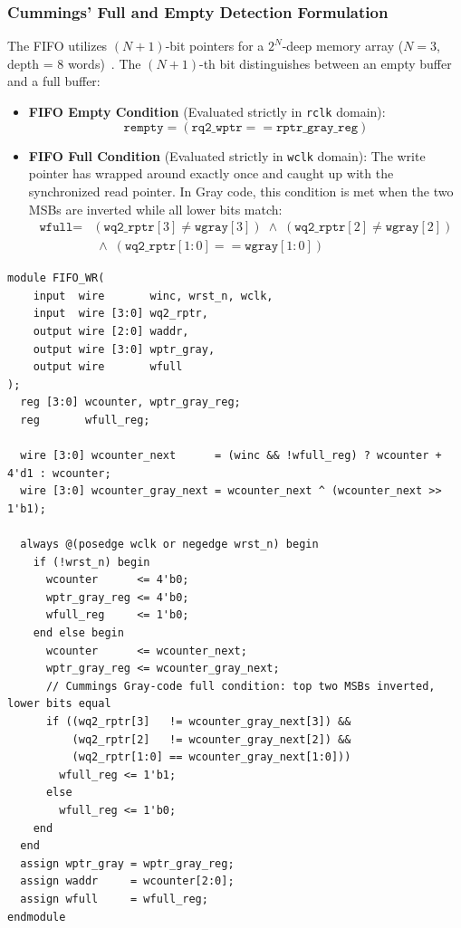 \documentclass[11pt,a4paper]{article}
\begin{document}
\subsubsection{Cummings' Full and Empty Detection Formulation}
The FIFO utilizes $(N+1)$-bit pointers for a $2^N$-deep memory array ($N=3$, depth = 8 words)~\cite{cummings_fifo}. The $(N+1)$-th bit distinguishes between an empty buffer and a full buffer:
\begin{itemize}
    \item \textbf{FIFO Empty Condition} (Evaluated strictly in \texttt{rclk} domain):
    \begin{equation}
    \texttt{rempty} = (\texttt{rq2\_wptr} == \texttt{rptr\_gray\_reg})
    \end{equation}
    \item \textbf{FIFO Full Condition} (Evaluated strictly in \texttt{wclk} domain): The write pointer has wrapped around exactly once and caught up with the synchronized read pointer. In Gray code, this condition is met when the two MSBs are inverted while all lower bits match:
    \begin{equation}
    \begin{split}
    \texttt{wfull} = & (\texttt{wq2\_rptr}[3] \neq \texttt{wgray}[3]) \;\land\; (\texttt{wq2\_rptr}[2] \neq \texttt{wgray}[2]) \\
                     & \;\land\; (\texttt{wq2\_rptr}[1:0] == \texttt{wgray}[1:0])
    \end{split}
    \end{equation}
\end{itemize}

\begin{lstlisting}[caption={Write Pointer and Full Flag Generation (FIFO\_WR.v).}]
module FIFO_WR(
    input  wire       winc, wrst_n, wclk,
    input  wire [3:0] wq2_rptr,
    output wire [2:0] waddr,
    output wire [3:0] wptr_gray,
    output wire       wfull
);
  reg [3:0] wcounter, wptr_gray_reg;
  reg       wfull_reg;

  wire [3:0] wcounter_next      = (winc && !wfull_reg) ? wcounter + 4'd1 : wcounter;
  wire [3:0] wcounter_gray_next = wcounter_next ^ (wcounter_next >> 1'b1);

  always @(posedge wclk or negedge wrst_n) begin
    if (!wrst_n) begin
      wcounter      <= 4'b0;
      wptr_gray_reg <= 4'b0;
      wfull_reg     <= 1'b0;
    end else begin
      wcounter      <= wcounter_next;
      wptr_gray_reg <= wcounter_gray_next;
      // Cummings Gray-code full condition: top two MSBs inverted, lower bits equal
      if ((wq2_rptr[3]   != wcounter_gray_next[3]) &&
          (wq2_rptr[2]   != wcounter_gray_next[2]) &&
          (wq2_rptr[1:0] == wcounter_gray_next[1:0]))
        wfull_reg <= 1'b1;
      else
        wfull_reg <= 1'b0;
    end
  end
  assign wptr_gray = wptr_gray_reg;
  assign waddr     = wcounter[2:0];
  assign wfull     = wfull_reg;
endmodule
\end{lstlisting}
\end{document}
